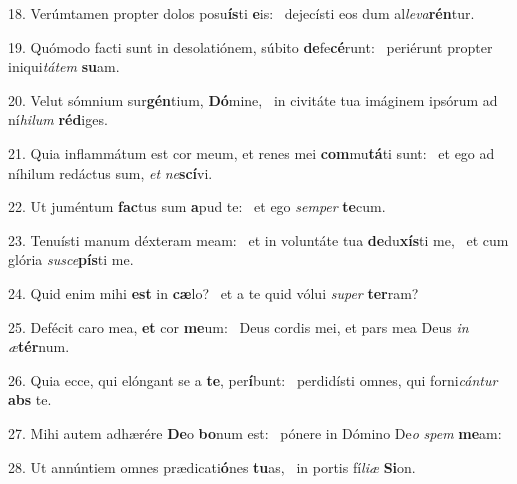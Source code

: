 18. Verúmtamen propter dolos posu\textbf{ís}ti \textbf{e}is: \ast\  dejecísti eos dum al\textit{le}\textit{va}\textbf{rén}tur.\

19. Quómodo facti sunt in desolatiónem, súbito \textbf{de}fe\textbf{cé}runt: \ast\  periérunt propter iniqui\textit{tá}\textit{tem} \textbf{su}am.\

20. Velut sómnium sur\textbf{gén}tium, \textbf{Dó}mine, \ast\  in civitáte tua imáginem ipsórum ad ní\textit{hi}\textit{lum} \textbf{réd}iges.\

21. Quia inflammátum est cor meum, et renes mei \textbf{com}mu\textbf{tá}ti sunt: \ast\  et ego ad níhilum redáctus sum, \textit{et} \textit{ne}\textbf{scí}vi.\

22. Ut juméntum \textbf{fac}tus sum \textbf{a}pud te: \ast\  et ego \textit{sem}\textit{per} \textbf{te}cum.\

23. Tenuísti manum déxteram meam: \dag\  et in voluntáte tua \textbf{de}du\textbf{xís}ti me, \ast\  et cum glória \textit{su}\textit{sce}\textbf{pís}ti me.\

24. Quid enim mihi \textbf{est} in \textbf{cæ}lo? \ast\  et a te quid vólui \textit{su}\textit{per} \textbf{ter}ram?\

25. Defécit caro mea, \textbf{et} cor \textbf{me}um: \ast\  Deus cordis mei, et pars mea Deus \textit{in} \textit{æ}\textbf{tér}num.\

26. Quia ecce, qui elóngant se a \textbf{te}, per\textbf{í}bunt: \ast\  perdidísti omnes, qui forni\textit{cán}\textit{tur} \textbf{abs} te.\

27. Mihi autem adhærére \textbf{De}o \textbf{bo}num est: \ast\  pónere in Dómino De\textit{o} \textit{spem} \textbf{me}am:\

28. Ut annúntiem omnes prædicati\textbf{ó}nes \textbf{tu}as, \ast\  in portis fí\textit{li}\textit{æ} \textbf{Si}on.\

